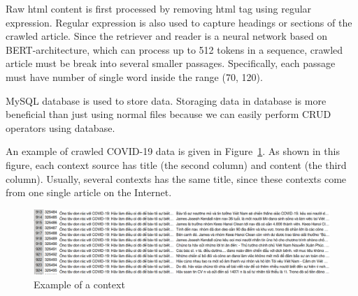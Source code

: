 \documentclass[12pt, sort&compress]{report}
\begin{document}
\par Raw html content is first processed by removing html tag using regular expression. Regular expression is also used to capture headings or sections of the crawled article. Since the retriever and reader is a neural network based on BERT-architecture, which can process up to 512 tokens in a sequence, crawled article must be break into several smaller passages. Specifically, each passage must have number of single word inside the range (70, 120).
\par MySQL database is used to store data. Storaging data in database is more beneficial than just using normal files because we can easily perform CRUD operators using database. 
\par An example of crawled COVID-19 data is given in Figure~\ref{fig:09}. As shown in this figure, each context source has title (the second column) and content (the third column). Usually, several contexts has the same title, since these contexts come from one single article on the Internet. 
\begin{figure}
	\centering
	\includegraphics[scale=.5]{images/crawled_data.png}
	\caption{Example of a context}
	\label{fig:09}
\end{figure}
\end{document}
